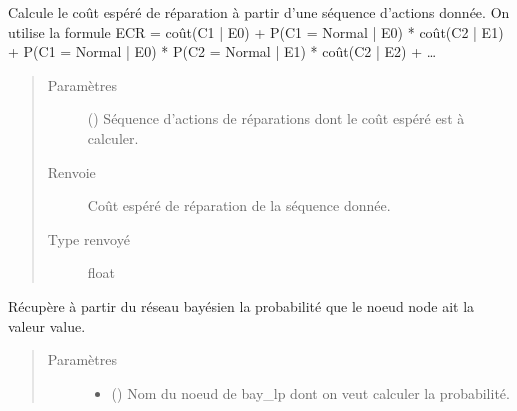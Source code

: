 \documentclass[letterpaper,10pt,french]{sphinxmanual}
\begin{document}
\begin{fulllineitems}
\begin{fulllineitems}
\label{\detokenize{index:DecisionTheoreticTroubleshooting.TroubleShootingProblem.expected_cost_of_repair_seq_of_actions}}
Calcule le coût espéré de réparation à partir d’une séquence d’actions
donnée. On utilise la formule
ECR = coût(C1 | E0)
+ P(C1 = Normal | E0) * coût(C2 | E1)
+ P(C1 = Normal | E0) * P(C2 = Normal | E1) * coût(C2 | E2)
+ …
\begin{quote}\begin{description}
\item[{Paramètres}] \leavevmode
{} (\sphinxstyleliteralemphasis{\sphinxupquote{(}}\sphinxstyleliteralemphasis{\sphinxupquote{)}}) \textendash{} Séquence d’actions de réparations dont le coût espéré est à
calculer.

\item[{Renvoie}] \leavevmode
{} \textendash{} Coût espéré de réparation de la séquence donnée.

\item[{Type renvoyé}] \leavevmode
float

\end{description}\end{quote}

\end{fulllineitems}


\begin{fulllineitems}
\label{\detokenize{index:DecisionTheoreticTroubleshooting.TroubleShootingProblem.get_proba}}
Récupère à partir du réseau bayésien la probabilité que le noeud node
ait la valeur value.
\begin{quote}\begin{description}
\item[{Paramètres}] \leavevmode\begin{itemize}
\item {} 
 () \textendash{} Nom du noeud de bay\_lp dont on veut calculer la probabilité.


\end{itemize}
\end{description}
\end{quote}
\end{fulllineitems}
\end{fulllineitems}
\end{document}
